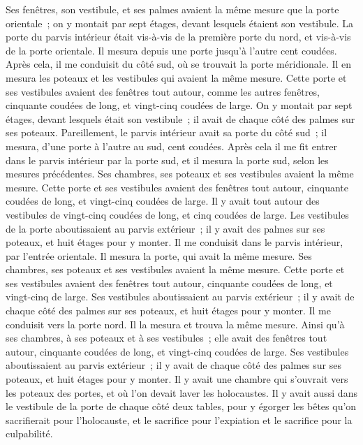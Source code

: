 \begin{multicols}{2}
Ses fenêtres, son vestibule, et ses palmes avaient la même mesure que la porte orientale~; on y montait par sept étages, devant lesquels étaient son vestibule.
La porte du parvis intérieur était vis-à-vis de la première porte du nord, et vis-à-vis de la porte orientale. Il mesura depuis une porte jusqu'à l'autre cent coudées.
Après cela, il me conduisit du côté sud, où se trouvait la porte méridionale. Il en mesura les poteaux et les vestibules qui avaient la même mesure.
Cette porte et ses vestibules avaient des fenêtres tout autour, comme les autres fenêtres, cinquante coudées de long, et vingt-cinq coudées de large.
On y montait par sept étages, devant lesquels était son vestibule~; il avait de chaque côté des palmes sur ses poteaux.
Pareillement, le parvis intérieur avait sa porte du côté sud~; il mesura, d'une porte à l'autre au sud, cent coudées.
Après cela il me fit entrer dans le parvis intérieur par la porte sud, et il mesura la porte sud, selon les mesures précédentes.
Ses chambres, ses poteaux et ses vestibules avaient la même mesure. Cette porte et ses vestibules avaient des fenêtres tout autour, cinquante coudées de long, et vingt-cinq coudées de large.
Il y avait tout autour des vestibules de vingt-cinq coudées de long, et cinq coudées de large.
Les vestibules de la porte aboutissaient au parvis extérieur~; il y avait des palmes sur ses poteaux, et huit étages pour y monter.
Il me conduisit dans le parvis intérieur, par l'entrée orientale. Il mesura la porte, qui avait la même mesure.
Ses chambres, ses poteaux et ses vestibules avaient la même mesure. Cette porte et ses vestibules avaient des fenêtres tout autour, cinquante coudées de long, et vingt-cinq de large.
Ses vestibules aboutissaient au parvis extérieur~; il y avait de chaque côté des palmes sur ses poteaux, et huit étages pour y monter.
Il me conduisit vers la porte nord. Il la mesura et trouva la même mesure.
Ainsi qu'à ses chambres, à ses poteaux et à ses vestibules~; elle avait des fenêtres tout autour, cinquante coudées de long, et vingt-cinq coudées de large.
Ses vestibules aboutissaient au parvis extérieur~; il y avait de chaque côté des palmes sur ses poteaux, et huit étages pour y monter.
Il y avait une chambre qui s'ouvrait vers les poteaux des portes, et où l'on devait laver les holocaustes.
Il y avait aussi dans le vestibule de la porte de chaque côté deux tables, pour y égorger les bêtes qu'on sacrifierait pour l'holocauste, et le sacrifice pour l'expiation et le sacrifice pour la culpabilité.

\end{multicols}

